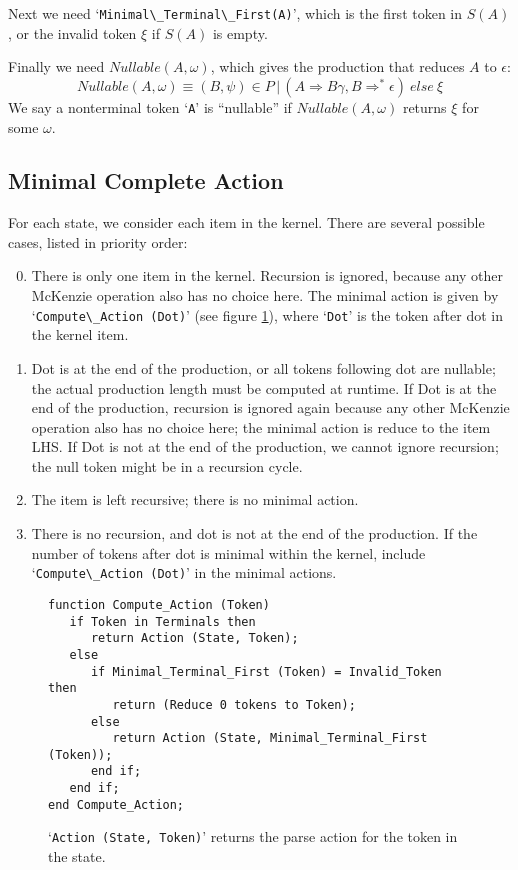 \documentclass[authordraft]{acmart}
\newcommand{\code}[1]{`\lstinline|#1|'}
\begin{document}
Next we need \code{Minimal\_Terminal\_First(A)}, which is the first
token in $S(A)$, or the invalid token $\xi$ if $S(A)$ is empty.

Finally we need $Nullable(A, \omega)$, which gives the production that
reduces $A$ to $\epsilon$:
\begin{equation}
Nullable(A, \omega) \equiv (B, \psi) \in P\, |\, (A \Rightarrow B \gamma, B \Rightarrow^* \epsilon)\ else\ \xi
\end{equation}
We say a nonterminal token \code{A} is ``nullable'' if
$Nullable(A, \omega)$ returns $\xi$ for some $\omega$.
\subsection{Minimal Complete Action}
For each state, we consider each item in the kernel. There are
several possible cases, listed in priority order:
\begin{enumerate}
  \setcounter{enumi}{-1}

\item There is only one item in the kernel. Recursion is ignored,
  because any other McKenzie operation also has no choice here. The
  minimal action is given by \code{Compute\_Action (Dot)} (see figure
  \ref{code:compute_action}), where \code{Dot} is the token after dot
  in the kernel item.

\item Dot is at the end of the production, or all tokens following dot
  are nullable; the actual production length must be computed at
  runtime. If Dot is at the end of the production, recursion is
  ignored again because any other McKenzie operation also has no
  choice here; the minimal action is reduce to the item LHS. If Dot is
  not at the end of the production, we cannot ignore recursion; the
  null token might be in a recursion cycle.

\item The item is left recursive; there is no minimal action.

\item There is no recursion, and dot is not at the end of the
  production. If the number of tokens after dot is minimal within the
  kernel, include \code{Compute\_Action (Dot)} in the minimal actions.

\end{enumerate}

\begin{figure}[H]
\begin{lstlisting}
function Compute_Action (Token)
   if Token in Terminals then
      return Action (State, Token);
   else
      if Minimal_Terminal_First (Token) = Invalid_Token then
         return (Reduce 0 tokens to Token);
      else
         return Action (State, Minimal_Terminal_First (Token));
      end if;
   end if;
end Compute_Action;
\end{lstlisting}

\code{Action (State, Token)} returns the parse action for
the token in the state.

\caption{}
\label{code:compute_action}
\end{figure}
\end{document}
